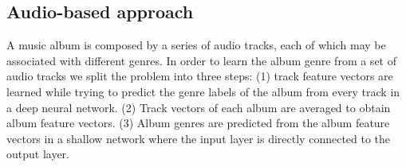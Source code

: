 




\subsection{Audio-based approach}\label{sec:multi-class:audio}

A music album is composed by a series of audio tracks, each of which may be associated with different genres. %
In order to learn the album genre from a set of audio tracks we split the problem into three steps: (1) track feature vectors are learned while trying to predict the genre labels of the album from every track in a deep neural network. (2) Track vectors of each album are averaged to obtain album feature vectors.
(3) Album genres are predicted from the album feature vectors in a shallow network where the input layer is directly connected to the output layer.

